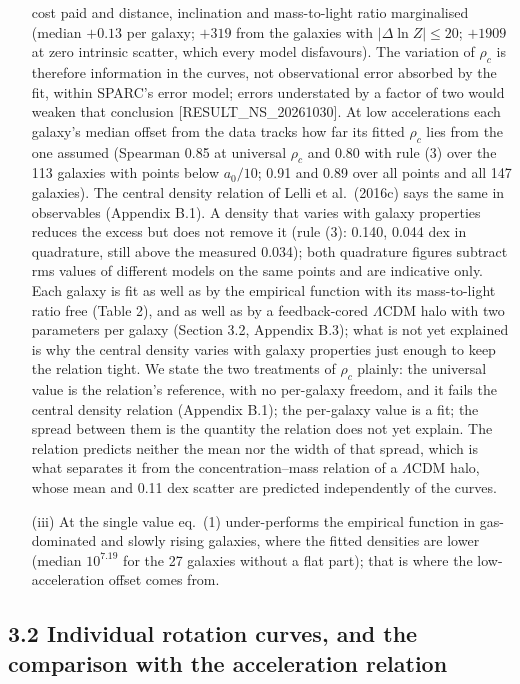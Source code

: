 \documentclass[
  10pt,
]{article}
\begin{document}
\begin{itemize}
cost paid and distance, inclination and mass-to-light ratio marginalised (median $+0.13$ per galaxy; $+319$ from the galaxies with $|\Delta\ln Z|\le20$; $+1909$ at zero intrinsic scatter, which every model disfavours). The variation of $\rho_c$ is therefore information in the curves, not observational error absorbed by the fit, within SPARC's error model; errors understated by a factor of two would weaken that conclusion {[}RESULT\_NS\_20261030{]}. At low accelerations each galaxy's median offset from the data tracks how far its fitted $\rho_c$ lies from the one assumed (Spearman 0.85 at universal $\rho_c$ and 0.80 with rule (3) over the 113 galaxies with points below $a_0/10$; 0.91 and 0.89 over all points and all 147 galaxies). The central density relation of Lelli et al.~(2016c) says the same in observables (Appendix B.1). A density that varies with galaxy properties reduces the excess but does not remove it (rule (3): 0.140, 0.044 dex in quadrature, still above the measured 0.034); both quadrature figures subtract rms values of different models on the same points and are indicative only. Each galaxy is fit as well as by the empirical function with its mass-to-light ratio free (Table 2), and as well as by a feedback-cored $\Lambda$CDM halo with two parameters per galaxy (Section 3.2, Appendix B.3); what is not yet explained is why the central density varies with galaxy properties just enough to keep the relation tight. We state the two treatments of $\rho_c$ plainly: the universal value is the relation's reference, with no per-galaxy freedom, and it fails the central density relation (Appendix B.1); the per-galaxy value is a fit; the spread between them is the quantity the relation does not yet explain. The relation predicts neither the mean nor the width of that spread, which is what separates it from the concentration--mass relation of a $\Lambda$CDM halo, whose mean and 0.11 dex scatter are predicted independently of the curves.
\item[(iii)] At the single value eq.~(1) under-performs the empirical function in gas-dominated and slowly rising galaxies, where the fitted densities are lower (median $10^{7.19}$ for the 27 galaxies without a flat part); that is where the low-acceleration offset comes from.
\end{itemize}


\subsection{3.2 Individual rotation curves, and the comparison with the acceleration relation}\label{individual-rotation-curves-and-the-comparison-with-the-acceleration-relation}
\end{document}
